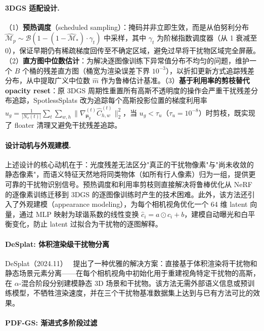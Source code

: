 \paragraph{3DGS 适配设计.}（1）\textbf{预热调度}（scheduled sampling）：掩码并非立即生效，而是从伯努利分布 $\hat{\mathcal{M}}_p \sim \mathcal{B}(1 - (1{-}\hat{\mathcal{M}}_*)\cdot\gamma_t)$ 中采样，其中 $\gamma_t$ 为阶梯指数调度器（从 1 衰减至 0），保证早期仍有稀疏梯度回传至不确定区域，避免过早将干扰物区域完全屏蔽。（2）\textbf{直方图中位数估计}：为解决逐图像训练下异常值分布不均匀的问题，维护一个 $B$ 个桶的残差直方图（桶宽为渲染误差下界 $10^{-3}$），以折扣更新方式追踪残差分布，从中提取广义中位数 $\hat{m}$ 作为鲁棒估计基准。（3）\textbf{基于利用率的剪枝替代 opacity reset}：原 3DGS 周期性重置所有高斯不透明度的操作会严重干扰残差分布追踪，SpotlessSplats 改为追踪每个高斯投影位置的梯度利用率 $u_g = \frac{1}{|N_v(t)|}\sum_{t}\sum_{w,h}\|\nabla^{(t)}_{\boldsymbol{\mu}_g}\hat{C}^{(t)}_{h,w}\|_2^2$，当 $u_g < \tau_u$（$\tau_u{=}10^{-8}$）时剪枝，既实现了 floater 清理又避免干扰残差追踪。

\paragraph{设计动机与外观建模.}上述设计的核心动机在于：光度残差无法区分"真正的干扰物像素"与"尚未收敛的静态像素"，而语义特征天然地将同类物体（如所有行人像素）归为一组，提供更可靠的干扰物识别信号。预热调度和利用率剪枝则直接解决将鲁棒优化从 NeRF 的逐像素训练迁移到 3DGS 的逐图像训练时产生的技术困难。此外，该方法还引入了外观建模（appearance modeling），为每个相机视角优化一个 64 维 latent 向量，通过 MLP 映射为球谐系数的线性变换 $\hat{c}_i = a \odot c_i + b$，建模自动曝光和白平衡变化，防止 latent 过拟合为干扰物的逐图解释。

\paragraph{DeSplat: 体积渲染级干扰物分离}

DeSplat（2024.11）~\cite{2411_19756} 提出了一种优雅的解决方案：直接基于体积渲染将干扰物和静态场景元素分离——在每个相机视角中初始化用于重建视角特定干扰物的高斯，在 $\alpha$-混合阶段分别建模静态 3D 场景和干扰物。该方法无需外部语义信息或预训练模型，不牺牲渲染速度，并在三个干扰物基准数据集上达到与已有方法可比的效果。

\paragraph{PDF-GS: 渐进式多阶段过滤}

